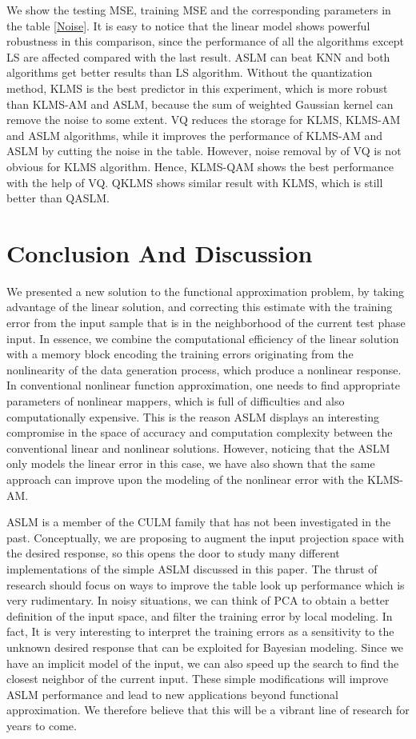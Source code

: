 \documentclass{article}
\begin{document}
We show the testing MSE, training MSE and the corresponding parameters in the table \ref{Noise}. It is easy to notice that the linear model shows powerful robustness in this comparison, since the performance of all the algorithms except LS are affected compared with the last result. ASLM can beat KNN and both algorithms get better results than LS algorithm. Without the quantization method, KLMS is the best predictor in this experiment, which is more robust than KLMS-AM and ASLM, because the sum of weighted Gaussian kernel can remove the noise to some extent. VQ reduces the storage for KLMS, KLMS-AM and ASLM algorithms, while it improves the performance of KLMS-AM and ASLM by cutting the noise in the table. However, noise removal by of VQ is not obvious for KLMS algorithm. Hence, KLMS-QAM shows the best performance with the help of VQ. QKLMS shows similar result with KLMS, which is still better than QASLM.
\vspace{-1.5mm}
\section{Conclusion And Discussion}
We presented a new solution to the functional approximation problem, by taking advantage of the linear solution, and correcting this estimate with the training error from the input sample that is in the neighborhood of the current test phase input. In essence, we combine the computational efficiency of the linear solution with a memory block encoding the training errors originating from the nonlinearity of the data generation process, which produce a nonlinear response. In conventional nonlinear function approximation, one needs to find appropriate parameters of nonlinear mappers, which is full of difficulties and also computationally expensive. This is the reason ASLM displays an interesting compromise in the space of accuracy and computation complexity between the conventional linear and nonlinear solutions. However, noticing that the ASLM only models the linear error in this case, we have also shown that the same approach can improve upon the modeling of the nonlinear error with the KLMS-AM.  

ASLM is a member of the CULM family that has not been investigated in the past. Conceptually, we are proposing to augment the input projection space with the desired response, so this opens the door to study many different implementations of the simple ASLM discussed in this paper. The thrust of research should focus on ways to improve the table look up performance which is very rudimentary. In noisy situations, we can think of PCA to obtain a better definition of the input space, and filter the training error by local modeling. In fact, It is very interesting to interpret the training errors as a sensitivity to the unknown desired response that can be exploited for Bayesian modeling. Since we have an implicit model of the input, we can also speed up the search to find the closest neighbor of the current input. These simple modifications will improve ASLM performance and lead to new applications beyond functional approximation. We therefore believe that this will be a vibrant line of research for years to come.
\end{document}
